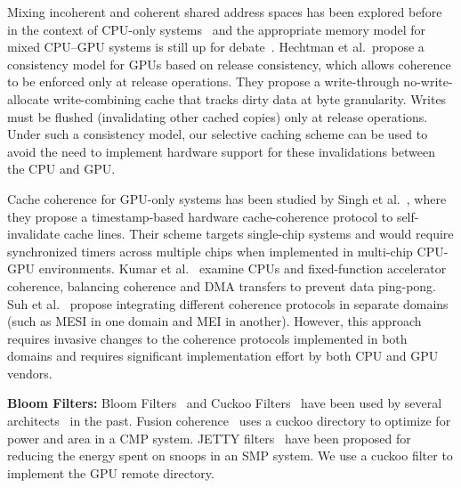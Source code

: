 Mixing incoherent and coherent shared address spaces has been explored before in the context of
CPU-only systems~\cite{Huh04} and the appropriate memory model for mixed
CPU--GPU systems is still up for
debate~\cite{Lim2012,Hechtman2014,Hower2014,Gaster2015}.  Hechtman et al.~propose 
a consistency model for GPUs based on release consistency, which allows
coherence to be enforced only at release operations.  They propose a 
write-through no-write-allocate write-combining cache that tracks dirty data
at byte granularity.  Writes must be flushed (invalidating other cached copies) only 
at release operations.  Under such a consistency model, our selective caching scheme 
can be used to avoid the need to implement hardware support for these invalidations between
the CPU and GPU.

Cache coherence for GPU-only systems has been studied by
Singh et al.~\cite{Singh2013}, where they propose a timestamp-based hardware 
cache-coherence protocol to self-invalidate cache lines. Their scheme targets 
single-chip systems and would require synchronized timers across multiple 
chips when implemented in multi-chip CPU-GPU environments.
Kumar et al.~\cite{Kumar2015} examine CPUs and fixed-function accelerator
coherence, balancing coherence and DMA transfers to prevent data ping-pong.
Suh et al.~\cite{Suh2004} propose integrating different coherence
protocols in separate domains (such as MESI in one domain and MEI in another). 
However, this approach requires invasive changes to
the coherence protocols implemented in both domains and
requires significant implementation effort by both CPU and GPU vendors.

\textbf{Bloom Filters:} Bloom Filters~\cite{Bloom1970} and Cuckoo
Filters~\cite{Pagh2004,fan2014} have been used by several
architects~\cite{Strauss2006,Zebchuk2009,Hongzhou2011} in the past. Fusion
coherence~\cite{wu2014} uses a cuckoo directory to optimize for power and area in
a CMP system. JETTY filters~\cite{Moshovos2001} have been proposed for reducing
the energy spent on snoops in an SMP system. We use a cuckoo filter to implement
the GPU remote directory.
